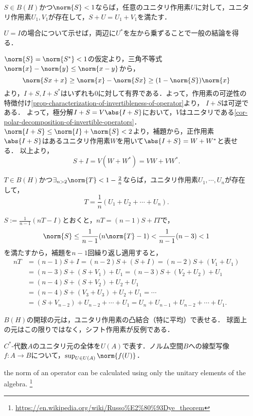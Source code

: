 \documentclass[uplatex,dvipdfmx]{jsreport}
\begin{document}
\begin{lemma}
    $S\in B(H)$かつ$\norm{S}<1$ならば，任意のユニタリ作用素$U$に対して，ユニタリ作用素$U_1,V_1$が存在して，$S+U=U_1+V_1$を満たす．
\end{lemma}
\begin{Proof}
    $U=I$の場合について示せば，両辺に$U^*$を左から乗ずることで一般の結論を得る．

    $\norm{S}=\norm{S^*}<1$の仮定より，三角不等式$\norm{x}-\norm{y}\le\norm{x-y}$から，
    \[\norm{Sx+x}\ge\norm{x}-\norm{Sx}\ge(1-\norm{S})\norm{x}\]
    より，$I+S,I+S^*$はいずれも$0$に対して有界である．よって，作用素の可逆性の特徴付け\ref{prop-characterization-of-invertibleness-of-operator}より，
    $I+S$は可逆である．
    よって，極分解$I+S=V\abs{I+S}$において，$V$はユニタリである\ref{cor-polar-decomposition-of-invertible-operators}．
    $\norm{I+S}\le\norm{I}+\norm{S}<2$より，補題から，正作用素$\abs{I+S}$はあるユニタリ作用素$W$を用いて$\abs{I+S}=W+W^*$と表せる．
    以上より，
    \[S+I=V(W+W^*)=VW+VW^*.\]
\end{Proof}

\begin{proposition}
    $T\in B(H)$かつ$\exists_{n>2}\norm{T}<1-\frac{2}{n}$ならば，ユニタリ作用素$U_1,\cdots,U_n$が存在して，
    \[T=\frac{1}{n}(U_1+U_2+\cdots+U_n).\]
\end{proposition}
\begin{Proof}
    $S:=\frac{1}{n-1}(nT-I)$とおくと，$nT=(n-1)S+IT$で，
    \[\norm{S}\le\frac{1}{n-1}(n\norm{T}-1)<\frac{1}{n-1}(n-3)<1\]
    を満たすから，補題を$n-1$回繰り返し適用すると，
    \begin{align*}
        nT&=(n-1)S+I=(n-2)S+(S+I)=(n-2)S+(V_1+U_1)\\
        &=(n-3)S+(S+V_1)+U_1=(n-3)S+(V_2+U_2)+U_1\\
        &=(n-4)S+(S+V_2)+U_2+U_1\\
        &=(n-4)S+(V_3+U_3)+U_2+U_1=\cdots\\
        &=(S+V_{n-2})+U_{n-2}+\cdots+U_1=U_n+U_{n-1}+U_{n-2}+\cdots+U_1.
    \end{align*}
\end{Proof}
\begin{remarks}
    $B(H)$の開球の元は，ユニタリ作用素の凸結合（特に平均）で表せる．
    球面上の元はこの限りではなく，シフト作用素が反例である．
\end{remarks}

\begin{corollary}[同じ論文で紹介されている系]
    $C^*$-代数$A$のユニタリ元の全体を$U(A)$で表す．ノルム空間$B$への線型写像$f:A\to B$について，$\sup_{U\in U(A)}\norm{f(U)}$．
\end{corollary}
\begin{remarks}
    the norm of an operator can be calculated using only the unitary elements of the algebra. \footnote{\url{https://en.wikipedia.org/wiki/Russo\%E2\%80\%93Dye_theorem}}
\end{remarks}
\end{document}
